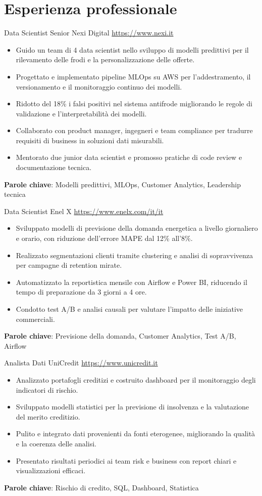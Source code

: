 \documentclass[a4paper, serif, 10pt]{moderncv}
\begin{document}
\section{Esperienza professionale}

        {Data Scientist Senior}
        {Nexi Digital}
        {\url{https://www.nexi.it}}
        {}
        {\begin{itemize}
\item Guido un team di 4 data scientist nello sviluppo di modelli predittivi per il rilevamento delle frodi e la personalizzazione delle offerte.
\item Progettato e implementato pipeline MLOps su AWS per l'addestramento, il versionamento e il monitoraggio continuo dei modelli.
\item Ridotto del 18\% i falsi positivi nel sistema antifrode migliorando le regole di validazione e l'interpretabilità dei modelli.
\item Collaborato con product manager, ingegneri e team compliance per tradurre requisiti di business in soluzioni dati misurabili.
\item Mentorato due junior data scientist e promosso pratiche di code review e documentazione tecnica.
\end{itemize}
\textbf{Parole chiave}: Modelli predittivi, MLOps, Customer Analytics, Leadership tecnica}

        {Data Scientist}
        {Enel X}
        {\url{https://www.enelx.com/it/it}}
        {}
        {\begin{itemize}
\item Sviluppato modelli di previsione della domanda energetica a livello giornaliero e orario, con riduzione dell'errore MAPE dal 12\% all'8\%.
\item Realizzato segmentazioni clienti tramite clustering e analisi di sopravvivenza per campagne di retention mirate.
\item Automatizzato la reportistica mensile con Airflow e Power BI, riducendo il tempo di preparazione da 3 giorni a 4 ore.
\item Condotto test A/B e analisi causali per valutare l'impatto delle iniziative commerciali.
\end{itemize}
\textbf{Parole chiave}: Previsione della domanda, Customer Analytics, Test A/B, Airflow}

        {Analista Dati}
        {UniCredit}
        {\url{https://www.unicredit.it}}
        {}
        {\begin{itemize}
\item Analizzato portafogli creditizi e costruito dashboard per il monitoraggio degli indicatori di rischio.
\item Sviluppato modelli statistici per la previsione di insolvenza e la valutazione del merito creditizio.
\item Pulito e integrato dati provenienti da fonti eterogenee, migliorando la qualità e la coerenza delle analisi.
\item Presentato risultati periodici ai team risk e business con report chiari e visualizzazioni efficaci.
\end{itemize}
\textbf{Parole chiave}: Rischio di credito, SQL, Dashboard, Statistica}
\end{document}
